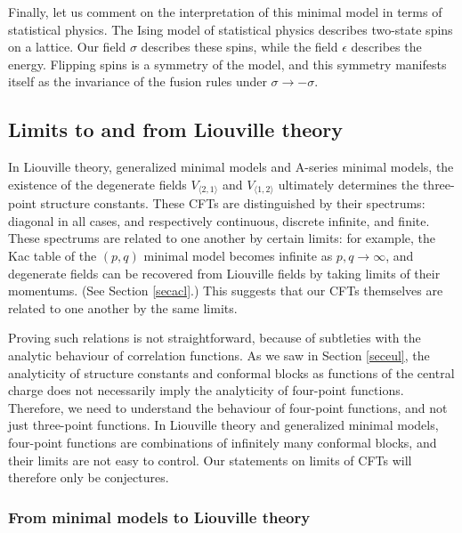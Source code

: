 \documentclass[12pt, a4paper, notitlepage, twoside]{report}
\numberwithin{equation}{section}
\theoremstyle{break}
\begin{document}
Finally, let us comment on the interpretation of this minimal model in terms of statistical physics.
The Ising model of statistical physics describes two-state spins on a lattice.
Our field $\sigma$ describes these spins, while the field $\epsilon$ describes the energy.
Flipping spins is a symmetry of the model, and this symmetry manifests itself as the invariance of the fusion rules under $\sigma\to -\sigma$. 

\subsection{Limits to and from Liouville theory}

In Liouville theory, generalized minimal models and A-series minimal models, the existence of the degenerate fields $V_{\langle 2,1\rangle}$ and $V_{\langle 1,2\rangle}$ ultimately determines the three-point structure constants. These CFTs are distinguished by their spectrums: diagonal in all cases, and respectively continuous, discrete infinite, and finite. These spectrums are related to one another by certain limits: for example, the Kac table of the $(p, q)$ minimal model becomes infinite as $p,q\to \infty$, and degenerate fields can be recovered from Liouville fields by taking limits of their momentums. (See Section \ref{secacl}.) This suggests that our CFTs themselves are related to one another by the same limits. 

Proving such relations is not straightforward, because of subtleties with the analytic behaviour of correlation functions. As we saw in Section \ref{seceul}, the analyticity of structure constants and conformal blocks as functions of the central charge does not necessarily imply the analyticity of four-point functions. Therefore, we need to understand the behaviour of four-point functions, and not just three-point functions. In Liouville theory and generalized minimal models, four-point functions are combinations of infinitely many conformal blocks, and their limits are not easy to control. Our statements on limits of CFTs will therefore only be conjectures.


\subsubsection{From minimal models to Liouville theory}
\end{document}
